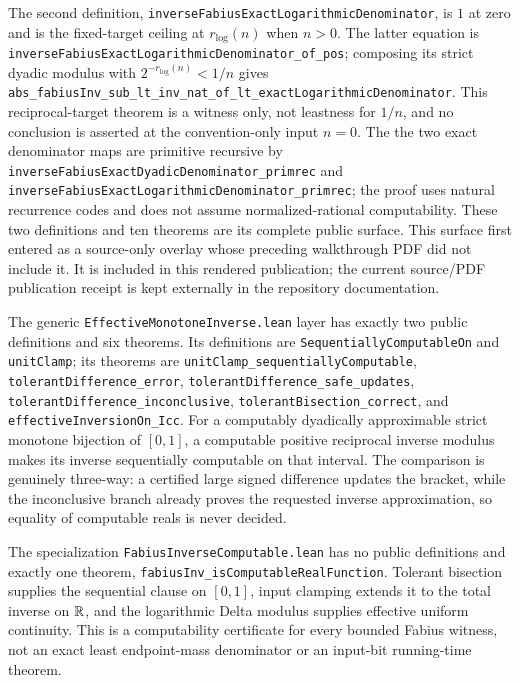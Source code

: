 \documentclass[11pt,oneside]{article}
\theoremstyle{definition}
\theoremstyle{remark}
\begin{document}
The second definition,
\nolinkurl{inverseFabiusExactLogarithmicDenominator}, is \(1\) at zero and is
the fixed-target ceiling at \(r_{\log}(n)\) when \(n>0\).  The latter equation
is \nolinkurl{inverseFabiusExactLogarithmicDenominator_of_pos}; composing its
strict dyadic modulus with \(2^{-r_{\log}(n)}<1/n\) gives
\nolinkurl{abs_fabiusInv_sub_lt_inv_nat_of_lt_exactLogarithmicDenominator}.
This reciprocal-target theorem is a witness only, not leastness for \(1/n\),
and no conclusion is asserted at the convention-only input \(n=0\).  The
the two exact denominator maps are primitive recursive by
\nolinkurl{inverseFabiusExactDyadicDenominator_primrec} and
\nolinkurl{inverseFabiusExactLogarithmicDenominator_primrec}; the proof uses
natural recurrence codes and does not assume normalized-rational
computability.  These two definitions and ten theorems are
its complete public surface.  This surface first entered as a source-only
overlay whose preceding walkthrough PDF did not include it.  It is included
in this rendered publication; the current source/PDF publication receipt is
kept externally in the repository documentation.

The generic \nolinkurl{EffectiveMonotoneInverse.lean} layer has exactly two
public definitions and six theorems.  Its definitions are
\nolinkurl{SequentiallyComputableOn} and \nolinkurl{unitClamp}; its theorems
are \nolinkurl{unitClamp_sequentiallyComputable},
\nolinkurl{tolerantDifference_error},
\nolinkurl{tolerantDifference_safe_updates},
\nolinkurl{tolerantDifference_inconclusive},
\nolinkurl{tolerantBisection_correct}, and
\nolinkurl{effectiveInversionOn_Icc}.  For a computably dyadically
approximable strict monotone bijection of \([0,1]\), a computable positive
reciprocal inverse modulus makes its inverse sequentially computable on that
interval.  The comparison is genuinely three-way: a certified large signed
difference updates the bracket, while the inconclusive branch already proves
the requested inverse approximation, so equality of computable reals is never
decided.

The specialization \nolinkurl{FabiusInverseComputable.lean} has no public
definitions and exactly one theorem,
\nolinkurl{fabiusInv_isComputableRealFunction}.  Tolerant bisection supplies
the sequential clause on \([0,1]\), input clamping extends it to the total
inverse on \(\mathbb{R}\), and the logarithmic Delta modulus supplies
effective uniform continuity.  This is a computability certificate for every
bounded Fabius witness, not an exact least endpoint-mass denominator or an
input-bit running-time theorem.
\end{document}
